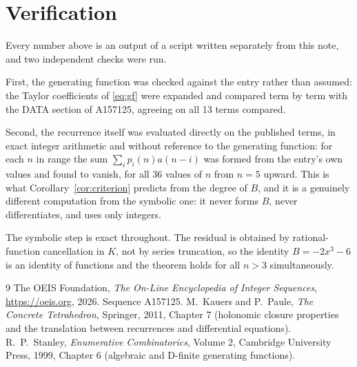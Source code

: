 \documentclass[11pt,a4paper]{article}
\theoremstyle{plain}
\theoremstyle{definition}
\begin{document}
\section{Verification}

Every number above is an output of a script written separately from this note, and two
independent checks were run.

First, the generating function was checked against the entry rather than assumed: the
Taylor coefficients of \eqref{eq:gf} were expanded and compared term by term with the DATA
section of A157125, agreeing on all 13 terms compared.

Second, the recurrence itself was evaluated directly on the published terms, in exact
integer arithmetic and without reference to the generating function: for each $n$ in range
the sum $\sum_{i}p_{i}(n)a(n-i)$ was formed from the entry's own values and found to
vanish, for all 36 values of $n$ from $n=5$ upward. This is what
Corollary~\ref{cor:criterion} predicts from the degree of $B$, and it is a genuinely
different computation from the symbolic one: it never forms $B$, never differentiates, and
uses only integers.

The symbolic step is exact throughout. The residual is obtained by rational-function
cancellation in $K$, not by series truncation, so the identity $B=- 2 x^{3} - 6$ is an
identity of functions and the theorem holds for all $n>3$ simultaneously.

\begin{thebibliography}{9}
 The OEIS Foundation, \emph{The On-Line Encyclopedia of Integer Sequences},
\url{https://oeis.org}, 2026. Sequence A157125.
 M.~Kauers and P.~Paule, \emph{The Concrete Tetrahedron}, Springer, 2011,
Chapter 7 (holonomic closure properties and the translation between recurrences and
differential equations).
 R.~P.~Stanley, \emph{Enumerative Combinatorics}, Volume 2, Cambridge
University Press, 1999, Chapter 6 (algebraic and D-finite generating functions).
\end{thebibliography}
\end{document}
